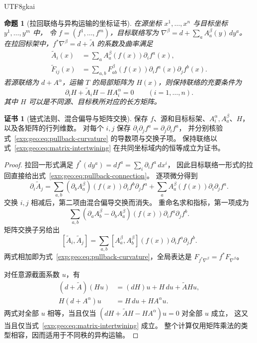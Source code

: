 \documentclass[12pt,a4paper,openany,notitlepage]{report}
\theoremstyle{plain}
\newtheorem{proposition}[theorem]{命题}
\theoremstyle{definition}
\newtheorem*{certificate}{证书}
\theoremstyle{remark}
\begin{document}
\begin{CJK*}{UTF8}{gkai}
\begin{proposition}[拉回联络与异构运输的坐标证书]
\label{exp:geo:prop:pullback-coordinates}
在源坐标 $x^1,\ldots,x^n$ 与目标坐标 $y^1,\ldots,y^m$ 中，
令 $f=(f^1,\ldots,f^m)$，目标联络写为
$\nabla^\beta=d+\sum_aA_a^\beta(y)\,dy^a$。
在拉回标架中，$f^*\nabla^\beta=d+\widetilde A$ 的系数及曲率满足
\begin{align}
\label{exp:geo:eq:pullback-connection}
\widetilde A_i(x)&=\sum_aA_a^\beta(f(x))\partial_i f^a(x),\\
\label{exp:geo:eq:pullback-curvature}
\widetilde F_{ij}(x)&=\sum_{a,b}F^\beta_{ab}(f(x))
\partial_i f^a(x)\partial_j f^b(x).
\end{align}
若源联络为 $d+A^\alpha$，运输 $T$ 的局部矩阵为 $H(x)$，则保持联络的充要条件为
\begin{equation}
\label{exp:geo:eq:matrix-intertwining}
\partial_iH+\widetilde A_iH-HA_i^\alpha=0
\qquad(i=1,\ldots,n).
\end{equation}
其中 $H$ 可以是不同源、目标秩所对应的长方矩阵。
\end{proposition}
\begin{certificate}[链式法则、混合偏导与矩阵交换]
保存 $f$、源和目标标架、$A_i^\alpha,A_a^\beta$、$H$，以及各矩阵的行列维数。
对每个 $i,j$ 保存 $\partial_i\partial_jf^a=\partial_j\partial_if^a$，
并分别核验式~\eqref{exp:geo:eq:pullback-curvature} 的导数项与交换子项。
保持联络以式~\eqref{exp:geo:eq:matrix-intertwining} 在共同坐标域内的恒等成立为证书。
\end{certificate}
\begin{proof}
拉回一形式满足 $f^*(dy^a)=df^a=\sum_i\partial_if^a\,dx^i$，
因此目标联络一形式的拉回直接给出式~\eqref{exp:geo:eq:pullback-connection}。
逐项微分得到
\[
\partial_i\widetilde A_j
=\sum_{a,b}(\partial_bA_a^\beta)(f(x))
\partial_if^b\partial_jf^a
+\sum_aA_a^\beta(f(x))\partial_i\partial_jf^a.
\]
交换 $i,j$ 相减后，第二项由混合偏导交换而消失。
重命名求和指标，第一项成为
\[
\sum_{a,b}(\partial_aA_b^\beta-\partial_bA_a^\beta)(f(x))
\partial_if^a\partial_jf^b.
\]
矩阵交换子另给出
\[
[\widetilde A_i,\widetilde A_j]
=\sum_{a,b}[A_a^\beta,A_b^\beta](f(x))
\partial_if^a\partial_jf^b.
\]
两式相加即为式~\eqref{exp:geo:eq:pullback-curvature}，全局表达是
$F_{f^*\nabla^\beta}=f^*F_{\nabla^\beta}$。

对任意源截面系数 $u$，有
\[
\begin{aligned}
(d+\widetilde A)(Hu)&=(dH)u+H\,du+\widetilde A H u,\\
H(d+A^\alpha)u&=H\,du+H A^\alpha u.
\end{aligned}
\]
两式对全部 $u$ 相等，当且仅当 $(dH+\widetilde A H-H A^\alpha)u=0$ 对全部 $u$ 成立，
这又当且仅当式~\eqref{exp:geo:eq:matrix-intertwining} 成立。
整个计算仅用矩阵乘法的类型相容，因而适用于不同秩的异构运输。
\end{proof}


\end{CJK*}
\end{document}
